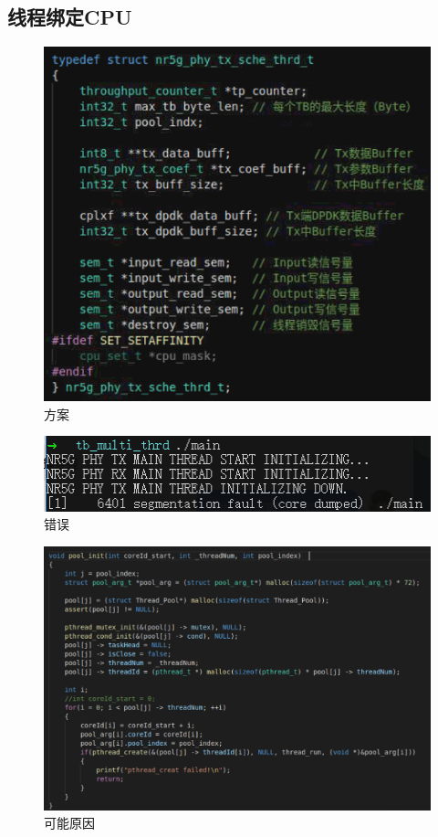 \documentclass{article}
\begin{document}
\subsection{线程绑定CPU}
\begin{figure}[H]
	\centering
	\includegraphics[width = .8\textwidth]{cpu.png}
	\caption{方案}
\end{figure}
\begin{figure}[H]
	\centering
	\includegraphics[width = .8\textwidth]{err.png}
	\caption{错误}
\end{figure}
\begin{figure}[H]
	\centering
	\includegraphics[width = .8\textwidth]{reason.png}
	\caption{可能原因}
\end{figure}
\end{document}
